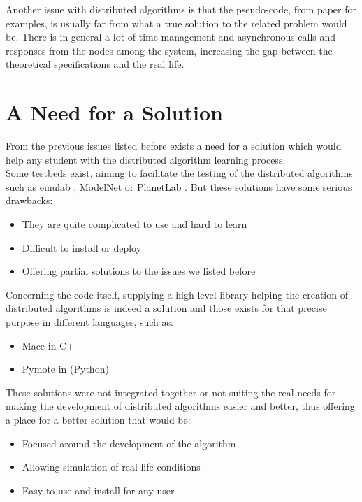 \documentclass{eplmastersthesis}
\begin{document}
      Another issue with distributed algorithms is that the pseudo-code,
      from paper for examples, is usually far from what a true solution to the
      related problem would be. There is in general a lot of time management
      and asynchronous calls and responses from the nodes among the system,
      increasing the gap between the theoretical specifications and the real
      life.

    \section{A Need for a Solution}

      From the previous issues listed before exists a need for a solution
      which would help any student with the distributed algorithm learning
      process.\\
      Some testbeds exist, aiming to facilitate the testing of the
      distributed algorithms such as emulab \cite{Emulab}, ModelNet
      \cite{ModelNet} or PlanetLab \cite{PlanetLab}. But these solutions have
      some serious drawbacks:

      \begin{itemize}
        \item They are quite complicated to use and hard to learn
        \item Difficult to install or deploy
        \item Offering partial solutions to the issues we listed before
      \end{itemize}

      Concerning the code itself, supplying a high level library helping the
      creation of distributed algorithms is indeed a solution and those
      exists for that precise purpose in different languages, such as:

      \begin{itemize}
        \item Mace \cite{Mace} in C++
        \item Pymote \cite{Pymote} in (Python)
      \end{itemize}

      These solutions were not integrated together or not suiting the real needs
      for making the development of distributed algorithms easier and better,
      thus offering a place for a better solution that would be:

      \begin{itemize}
        \item Focused around the development of the algorithm
        \item Allowing simulation of real-life conditions
        \item Easy to use and install for any user
      \end{itemize}
\end{document}
